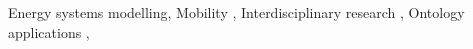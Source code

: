 ﻿\begin{keywords}
  Energy systems modelling\sep
  Mobility \sep
  Interdisciplinary research \sep
  Ontology applications \sep
\end{keywords}